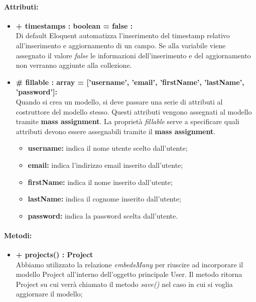 	\paragraph{Attributi:}
	\begin{itemize}
		\item \textbf{+ timestamps : boolean = false :}\\
		Di default Eloquent automatizza l'inserimento del timestamp relativo all'inserimento e aggiornamento di un campo. Se alla variabile viene assegnato il valore \textit{false} le informazioni dell'inserimento e del aggiornamento non verranno aggiunte alla collezione.
		\item \textbf{\# fillable : array = ['username', 'email', 'firstName', 'lastName', 'password']:}\\
		Quando si crea un modello, si deve passare una serie di attributi al costruttore del modello stesso. Questi attributi vengono assegnati al modello tramite \textbf{mass assignment}. La proprietà \textit{fillable} serve a specificare quali attributi devono essere assegnabili tramite il \textbf{mass assignment}.
		\begin{itemize}
			\item \textbf{username:} indica il nome utente scelto dall'utente;
			\item \textbf{email:} indica l'indirizzo email inserito dall'utente;
			\item \textbf{firstName:} indica il nome inserito dall'utente;
			\item \textbf{lastName:} indica il cognome inserito dall'utente;
			\item \textbf{password:} indica la password scelta dall'utente.
		\end{itemize}
	\end{itemize}
	
	\paragraph{Metodi:}
	\begin{itemize}
		\item \textbf{+ projects() : Project}\\
		Abbiamo utilizzato la relazione \textit{embedsMany} per riuscire ad incorporare il modello Project all'interno dell'oggetto principale User. Il metodo ritorna Project su cui verrà chiamato il metodo \textit{save()} nel caso in cui si voglia aggiornare il modello;
	\end{itemize}
\newpage

